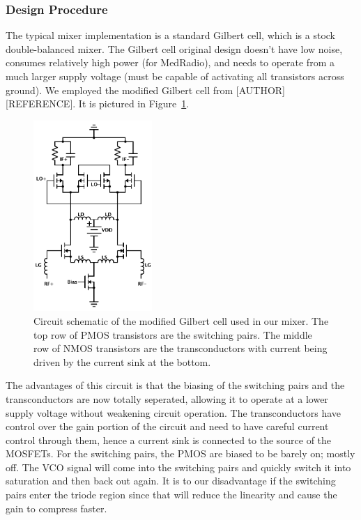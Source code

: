 \subsubsection{Design Procedure}
The typical mixer implementation is a standard Gilbert cell, which is a stock double-balanced mixer. The Gilbert cell original design doesn't have low noise, consumes relatively high power (for MedRadio), and needs to operate from a much larger supply voltage (must be capable of activating all transistors across ground). We employed the modified Gilbert cell from [AUTHOR] [REFERENCE]. It is pictured in Figure~\ref{fig:mixer}. 

\begin{figure}[h]
   \centering
    \includegraphics[width=0.40\textwidth]{figures/Mixer.pdf}
    \caption{
        Circuit schematic of the modified Gilbert cell used in our mixer. The top row of PMOS transistors are the switching pairs. The middle row of NMOS transistors are the transconductors with current being driven by the current sink at the bottom.
    }
    \label{fig:mixer}
\end{figure}

The advantages of this circuit is that the biasing of the switching pairs and the transconductors are now totally seperated, allowing it to operate at a lower supply voltage without weakening circuit operation. The transconductors have control over the gain portion of the circuit and need to have careful current control through them, hence a current sink is connected to the source of the MOSFETs. For the switching pairs, the PMOS are biased to be barely on; mostly off.  The VCO signal will come into the switching pairs and quickly switch it into saturation and then back out again. It is to our disadvantage if the switching pairs enter the triode region since that will reduce the linearity and cause the gain to compress faster. 

